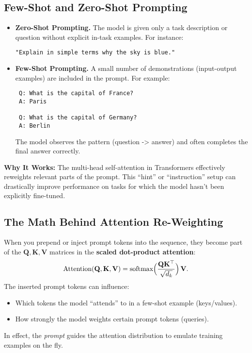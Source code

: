 \subsection{Few-Shot and Zero-Shot Prompting}
\begin{itemize}
    \item \textbf{Zero-Shot Prompting.} The model is given only a task description or question without explicit in-task examples. For instance:
\begin{verbatim}
"Explain in simple terms why the sky is blue."
\end{verbatim}
    \item \textbf{Few-Shot Prompting.} A small number of demonstrations (input-output examples) are included in the prompt. For example:
\begin{verbatim}
 Q: What is the capital of France? 
 A: Paris

 Q: What is the capital of Germany?
 A: Berlin
\end{verbatim}
  The model observes the pattern (question -> answer) and often completes the final answer correctly.
\end{itemize}

\noindent
\textbf{Why It Works:} The multi-head self-attention in Transformers effectively reweights relevant parts of the prompt. This “hint” or “instruction” setup can drastically improve performance on tasks for which the model hasn’t been explicitly fine-tuned.

\subsection{The Math Behind Attention Re-Weighting}
\noindent
When you prepend or inject prompt tokens into the sequence, they become part of the \(\mathbf{Q}, \mathbf{K}, \mathbf{V}\) matrices in the \textbf{scaled dot-product attention}:
\[
\text{Attention}(\mathbf{Q}, \mathbf{K}, \mathbf{V}) 
= 
\text{softmax}\Bigl(\frac{\mathbf{Q}\mathbf{K}^\top}{\sqrt{d_k}}\Bigr)\,\mathbf{V}.
\]
The inserted prompt tokens can influence:
\begin{itemize}
    \item Which tokens the model “attends” to in a few-shot example (keys/values).
    \item How strongly the model weights certain prompt tokens (queries).
\end{itemize}
In effect, the \emph{prompt} guides the attention distribution to emulate training examples on the fly.

